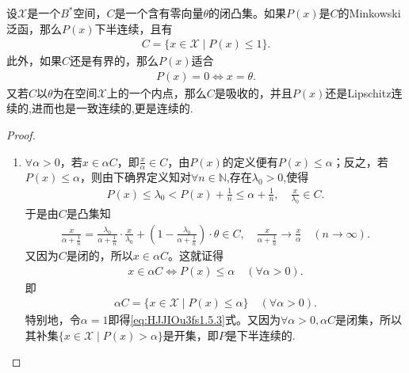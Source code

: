 \documentclass[../../main.tex]{subfiles}%
\begin{document}
\begin{proposition}\label{proposition:泛函分析--命题1.5.11}
设$\mathscr{X}$是一个$B^*$空间，$C$是一个含有零向量$\theta$的闭凸集。如果$P(x)$是$C$的Minkowski泛函，那么$P(x)$下半连续，且有
\begin{align}
C = \{ x \in \mathscr{X} \mid P(x) \leqslant 1 \}. \label{eq:HJJIOu3fs1.5.3}
\end{align}
此外，如果$C$还是有界的，那么$P(x)$适合
\begin{align*}
P(x) = 0 \iff x = \theta.
\end{align*}
又若$C$以$\theta$为在空间$\mathscr{X}$上的一个内点，那么$C$是吸收的，并且$P(x)$还是Lipschitz连续的,进而也是一致连续的,更是连续的.
\end{proposition}
\begin{proof}
\begin{enumerate}[(1)]
\item $\forall \alpha > 0$，若$x \in \alpha C$，即$\frac{x}{\alpha} \in C$，由$P(x)$的定义便有$P(x) \leqslant \alpha$；反之，若$P(x) \leqslant \alpha$，则由下确界定义知对$\forall n \in \mathbb{N}$,存在$\lambda_0>0$,使得
\begin{align*}
P\left( x \right) \leqslant \lambda _0<P\left( x \right) +\frac{1}{n}\leqslant \alpha +\frac{1}{n},\quad \frac{x}{\lambda _0}\in C.
\end{align*}
于是由$C$是凸集知
\begin{align*}
\frac{x}{\alpha +\frac{1}{n}}=\frac{\lambda _0}{\alpha +\frac{1}{n}}\cdot \frac{x}{\lambda _0}+\left( 1-\frac{\lambda _0}{\alpha +\frac{1}{n}} \right) \cdot \theta \in C,\quad \frac{x}{\alpha +\frac{1}{n}}\rightarrow \frac{x}{\alpha}\quad (n\rightarrow \infty ).
\end{align*}
又因为$C$是闭的，所以$x \in \alpha C$。这就证得
\begin{align*}
x\in \alpha C\iff P(x)\leqslant \alpha\quad (\forall \alpha >0).
\end{align*}
即
\begin{align*}
\alpha C = \{ x \in \mathscr{X} \mid P(x) \leqslant \alpha \} \quad (\forall \alpha > 0). 
\end{align*}
特别地，令$\alpha = 1$即得\eqref{eq:HJJIOu3fs1.5.3}式。又因为$\forall \alpha > 0, \alpha C$是闭集，所以其补集$\{x\in \mathscr{X}\mid P(x)>\alpha\}$是开集，即$P$是下半连续的.


\end{enumerate}
\end{proof}
\end{document}
